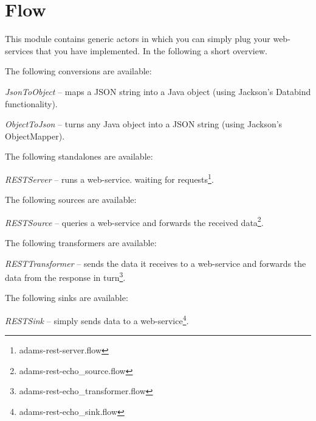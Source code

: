 \documentclass[a4paper]{book}
\begin{document}
\chapter{Flow}
This module contains generic actors in which you can simply plug your 
web-services that you have implemented. In the following a short overview.

The following conversions are available:
\begin{tight_itemize}
	\item \textit{JsonToObject} -- maps a JSON string into a Java object
	(using Jackson's Databind functionality\cite{jackson}).
	\item \textit{ObjectToJson} -- turns any Java object into a JSON string
	(using Jackson's ObjectMapper\cite{jackson}).
\end{tight_itemize}
The following standalones are available:
\begin{tight_itemize}
	\item \textit{RESTServer} -- runs a web-service. waiting for
	requests\footnote{adams-rest-server.flow}.
\end{tight_itemize}
The following sources are available:
\begin{tight_itemize}
	\item \textit{RESTSource} -- queries a web-service and forwards the received
	data\footnote{adams-rest-echo\_source.flow}.
\end{tight_itemize}
The following transformers are available:
\begin{tight_itemize}
	\item \textit{RESTTransformer} -- sends the data it receives to a web-service
	and forwards the data from the response in
	turn\footnote{adams-rest-echo\_transformer.flow}.
\end{tight_itemize}
The following sinks are available:
\begin{tight_itemize}
	\item \textit{RESTSink} -- simply sends data to a web-service\footnote{adams-rest-echo\_sink.flow}.
\end{tight_itemize}
\end{document}
